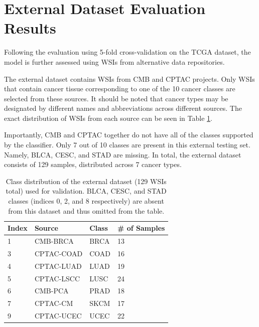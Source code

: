 \documentclass{l4proj}
\begin{document}
\section{External Dataset Evaluation Results} \label{sec:external}
Following the evaluation using 5-fold cross-validation on the TCGA dataset, the model is further assessed using WSIs from alternative data repositories.

The external dataset contains WSIs from CMB and CPTAC projects. Only WSIs that contain cancer tissue corresponding to one of the 10 cancer classes are selected from these sources. It should be noted that cancer types may be designated by different names and abbreviations across different sources. The exact distribution of WSIs from each source can be seen in Table \ref{tab:extdata}. 

Importantly, CMB and CPTAC together do not have all of the classes supported by the classifier. Only 7 out of 10 classes are present in this external testing set. Namely, BLCA, CESC, and STAD are missing. In total, the external dataset consists of 129 samples, distributed across 7 cancer types.

\begin{table}[b]
\centering
\caption{Class distribution of the external dataset (129 WSIs total) used for validation. BLCA, CESC, and STAD classes (indices 0, 2, and 8 respectively) are absent from this dataset and thus omitted from the table.}
\label{tab:extdata}
\begin{tabular}{@{}llll@{}}
\textbf{Index} & \textbf{Source} & \textbf{Class} & \textbf{\# of Samples} \\ \midrule
1              & CMB-BRCA        & BRCA           & 13                     \\
3              & CPTAC-COAD      & COAD           & 16                     \\
4              & CPTAC-LUAD      & LUAD           & 19                     \\
5              & CPTAC-LSCC      & LUSC           & 24                     \\
6              & CMB-PCA         & PRAD           & 18                     \\
7              & CPTAC-CM        & SKCM           & 17                     \\
9              & CPTAC-UCEC      & UCEC           & 22                    
\end{tabular}
\end{table}
\end{document}
